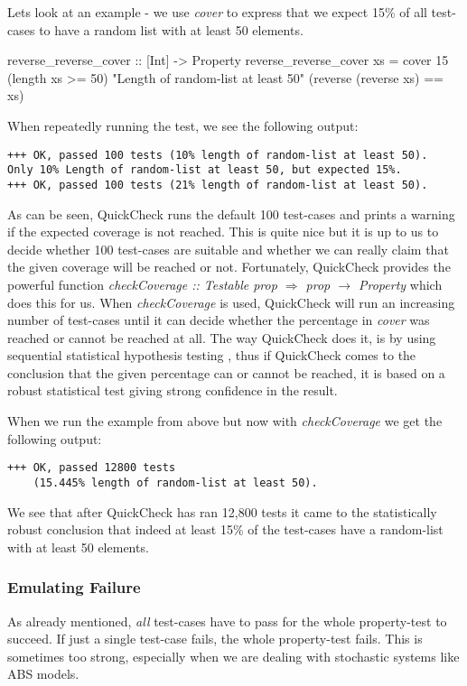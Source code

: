 Lets look at an example - we use \textit{cover} to express that we expect 15\% of all test-cases to have a random list with at least 50 elements.

\begin{HaskellCode}
reverse_reverse_cover :: [Int] -> Property
reverse_reverse_cover xs  
  = cover 15 (length xs >= 50) "Length of random-list at least 50"
             (reverse (reverse xs) == xs)
\end{HaskellCode}

When repeatedly running the test, we see the following output:

\begin{verbatim}
+++ OK, passed 100 tests (10% length of random-list at least 50).
Only 10% Length of random-list at least 50, but expected 15%.
+++ OK, passed 100 tests (21% length of random-list at least 50).
\end{verbatim}

As can be seen, QuickCheck runs the default 100 test-cases and prints a warning if the expected coverage is not reached. This is quite nice but it is up to us to decide whether 100 test-cases are suitable and whether we can really claim that the given coverage will be reached or not. Fortunately, QuickCheck provides the powerful function \textit{checkCoverage :: Testable prop $\Rightarrow$ prop $\rightarrow$ Property} which does this for us. When \textit{checkCoverage} is used, QuickCheck will run an increasing number of test-cases until it can decide whether the percentage in \textit{cover} was reached or cannot be reached at all. The way QuickCheck does it, is by using sequential statistical hypothesis testing \cite{wald_sequential_1992}, thus if QuickCheck comes to the conclusion that the given percentage can or cannot be reached, it is based on a robust statistical test giving strong confidence in the result.

When we run the example from above but now with \textit{checkCoverage} we get the following output:

\begin{verbatim}
+++ OK, passed 12800 tests 
    (15.445% length of random-list at least 50).
\end{verbatim}

We see that after QuickCheck has ran 12,800 tests it came to the statistically robust conclusion that indeed at least 15\% of the test-cases have a random-list with at least 50 elements. 

\subsubsection*{Emulating Failure}
As already mentioned, \textit{all} test-cases have to pass for the whole property-test to succeed. If just a single test-case fails, the whole property-test fails. This is sometimes too strong, especially when we are dealing with stochastic systems like ABS models.


